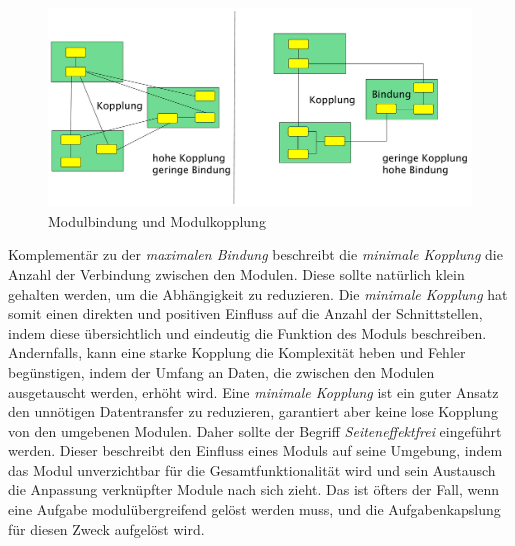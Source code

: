     \begin{figure}[h]
      \includegraphics[width=\textwidth]{material/images/kopplung.pdf}
      \caption{Modulbindung und Modulkopplung \cite{modulMitJava9}}
      \label{fig:kopplung}
    \end{figure}

    Komplementär zu der \textit{maximalen Bindung} beschreibt die \textit{minimale Kopplung} die Anzahl der Verbindung zwischen den Modulen. Diese sollte natürlich klein gehalten werden, um die Abhängigkeit zu reduzieren. Die \textit{minimale Kopplung} hat somit einen direkten und positiven Einfluss auf die Anzahl der Schnittstellen, indem diese übersichtlich und eindeutig die Funktion des Moduls beschreiben. Andernfalls, kann eine starke Kopplung die Komplexität heben und Fehler begünstigen, indem der Umfang an Daten, die zwischen den Modulen ausgetauscht werden, erhöht wird. Eine \textit{minimale Kopplung} ist ein guter Ansatz den unnötigen Datentransfer zu reduzieren, garantiert aber keine lose Kopplung von den umgebenen Modulen. Daher sollte der Begriff \textit{Seiteneffektfrei} eingeführt werden. Dieser beschreibt den Einfluss eines Moduls auf seine Umgebung, indem das Modul unverzichtbar für die Gesamtfunktionalität wird und sein Austausch die Anpassung verknüpfter Module nach sich zieht. Das ist öfters der Fall, wenn eine Aufgabe modulübergreifend gelöst werden muss, und die Aufgabenkapslung für diesen Zweck aufgelöst wird.\cite{softModDes,softMdDes2,modulMitJava9,java9modRevealed,modulProgJava9}

